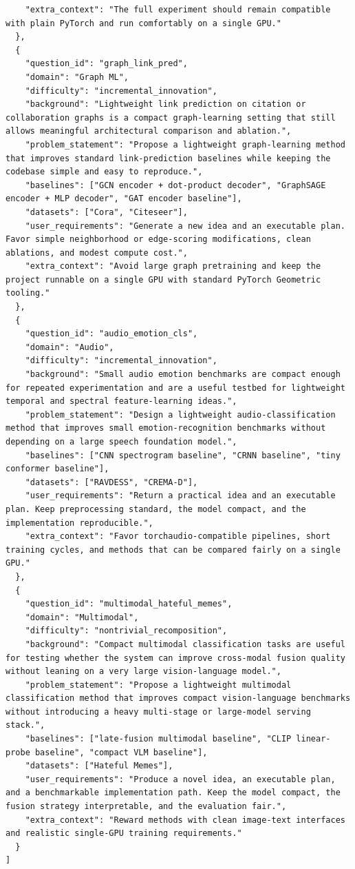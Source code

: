 \documentclass{opendatalab}
\begin{document}
\begin{lstlisting}
    "extra_context": "The full experiment should remain compatible with plain PyTorch and run comfortably on a single GPU."
  },
  {
    "question_id": "graph_link_pred",
    "domain": "Graph ML",
    "difficulty": "incremental_innovation",
    "background": "Lightweight link prediction on citation or collaboration graphs is a compact graph-learning setting that still allows meaningful architectural comparison and ablation.",
    "problem_statement": "Propose a lightweight graph-learning method that improves standard link-prediction baselines while keeping the codebase simple and easy to reproduce.",
    "baselines": ["GCN encoder + dot-product decoder", "GraphSAGE encoder + MLP decoder", "GAT encoder baseline"],
    "datasets": ["Cora", "Citeseer"],
    "user_requirements": "Generate a new idea and an executable plan. Favor simple neighborhood or edge-scoring modifications, clean ablations, and modest compute cost.",
    "extra_context": "Avoid large graph pretraining and keep the project runnable on a single GPU with standard PyTorch Geometric tooling."
  },
  {
    "question_id": "audio_emotion_cls",
    "domain": "Audio",
    "difficulty": "incremental_innovation",
    "background": "Small audio emotion benchmarks are compact enough for repeated experimentation and are a useful testbed for lightweight temporal and spectral feature-learning ideas.",
    "problem_statement": "Design a lightweight audio-classification method that improves small emotion-recognition benchmarks without depending on a large speech foundation model.",
    "baselines": ["CNN spectrogram baseline", "CRNN baseline", "tiny conformer baseline"],
    "datasets": ["RAVDESS", "CREMA-D"],
    "user_requirements": "Return a practical idea and an executable plan. Keep preprocessing standard, the model compact, and the implementation reproducible.",
    "extra_context": "Favor torchaudio-compatible pipelines, short training cycles, and methods that can be compared fairly on a single GPU."
  },
  {
    "question_id": "multimodal_hateful_memes",
    "domain": "Multimodal",
    "difficulty": "nontrivial_recomposition",
    "background": "Compact multimodal classification tasks are useful for testing whether the system can improve cross-modal fusion quality without leaning on a very large vision-language model.",
    "problem_statement": "Propose a lightweight multimodal classification method that improves compact vision-language benchmarks without introducing a heavy multi-stage or large-model serving stack.",
    "baselines": ["late-fusion multimodal baseline", "CLIP linear-probe baseline", "compact VLM baseline"],
    "datasets": ["Hateful Memes"],
    "user_requirements": "Produce a novel idea, an executable plan, and a benchmarkable implementation path. Keep the model compact, the fusion strategy interpretable, and the evaluation fair.",
    "extra_context": "Reward methods with clean image-text interfaces and realistic single-GPU training requirements."
  }
]
\end{lstlisting}
\end{document}

